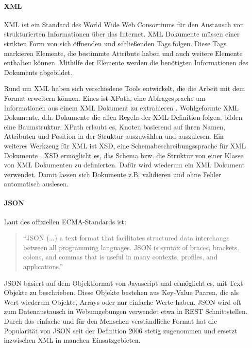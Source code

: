 \paragraph*{XML}

XML ist ein Standard des World Wide Web Consortiums für den Austausch von strukturierten Informationen über das Internet. XML Dokumente müssen einer strikten Form von sich öffnenden und schließenden Tags folgen. Diese Tags markieren Elemente, die bestimmte Attribute haben und auch weitere Elemente enthalten können. Mithilfe der Elemente werden die benötigten Informationen des Dokuments abgebildet. \cite{xml.09.10.2018}

Rund um XML haben sich verschiedene Tools entwickelt, die die Arbeit mit dem Format erweitern können. Eines ist XPath, eine Abfragesprache um Informationen aus einem XML Dokument zu extrahieren \cite{xpath.06.04.2021}. Wohlgeformte XML Dokumente, d.h. Dokumente die allen Regeln der XML Definition folgen, bilden eine Baumstruktur. XPath erlaubt es, Knoten basierend auf ihren Namen, Attributen und Position in der Struktur auszuwählen und auszulesen.
Ein weiteres Werkzeug für XML ist XSD, eine Schemabeschreibungssprache für XML Dokumente \cite{xsd.09.10.2018}. XSD ermöglicht es, das Schema bzw. die Struktur von einer Klasse von XML Dokumenten zu definierten. Dafür wird wiederum ein XML Dokument verwendet. Damit lassen sich Dokumente z.B. validieren und ohne Fehler automatisch auslesen.



\paragraph*{JSON}

Laut des offiziellen ECMA-Standards ist:
\begin{quote}
"`JSON (...) a text format that facilitates structured data interchange between all programming languages. JSON 
is syntax of braces, brackets, colons, and commas that is useful in many contexts, profiles, and applications."' \cite[Seite iii]{EcmaInternational.04.02.2021}
\end{quote}

\ac{JSON} basiert auf dem Objektformat von Javascript und ermöglicht es, mit Text Objekte zu beschrieben. Diese Objekte bestehen aus Key-Value Paaren, die als Wert wiederum Objekte, Arrays oder nur einfache Werte haben.
\ac{JSON} wird oft zum Datenaustausch in Webumgebungen verwendet etwa in REST Schnittstellen. Durch das einfache und für den Menschen verständliche Format hat die Popularität von JSON seit der Definition 2006 stetig zugenommen und ersetzt inzwischen XML in manchen Einsatzgebieten.

